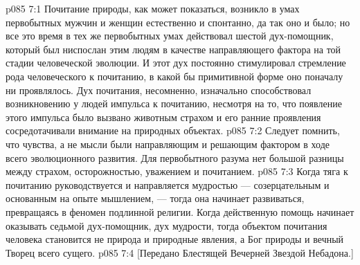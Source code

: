 \vs p085 7:1 Почитание природы, как может показаться, возникло в умах первобытных мужчин и женщин естественно и спонтанно, да так оно и было; но все это время в тех же первобытных умах действовал шестой дух\hyp{}помощник, который был ниспослан этим людям в качестве направляющего фактора на той стадии человеческой эволюции. И этот дух постоянно стимулировал стремление рода человеческого к почитанию, в какой бы примитивной форме оно поначалу ни проявлялось. Дух почитания, несомненно, изначально способствовал возникновению у людей импульса к почитанию, несмотря на то, что появление этого импульса было вызвано животным страхом и его ранние проявления сосредотачивали внимание на природных объектах.
\vs p085 7:2 Следует помнить, что чувства, а не мысли были направляющим и решающим фактором в ходе всего эволюционного развития. Для первобытного разума нет большой разницы между страхом, осторожностью, уважением и почитанием.
\vs p085 7:3 Когда тяга к почитанию руководствуется и направляется мудростью --- созерцательным и основанным на опыте мышлением, --- тогда она начинает развиваться, превращаясь в феномен подлинной религии. Когда действенную помощь начинает оказывать седьмой дух\hyp{}помощник, дух мудрости, тогда объектом почитания человека становится не природа и природные явления, а Бог природы и вечный Творец всего сущего.
\vs p085 7:4 [Передано Блестящей Вечерней Звездой Небадона.]
